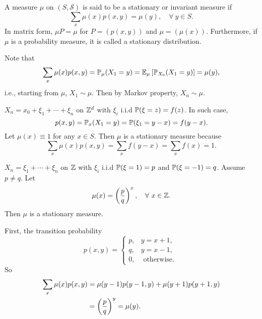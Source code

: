 \begin{defn}
    A measure $\mu$ on $(S,\mathcal{S})$ is said to be a stationary or invariant measure if
    \begin{equation*}
        \sum_x \mu(x)p(x,y) = \mu(y),\quad \forall~y \in S.
    \end{equation*}
    In matrix form, $\mu P = \mu$ for $P = (p(x,y))$ and $\mu = (\mu(x))$. Furthermore, if $\mu$ is a probability measure, it is called a stationary distribution.
\end{defn}
\begin{rmk}
    Note that
    \begin{equation*}
        \sum_x \mu(x)p(x,y) = \mathbb{P}_\mu(X_1 = y) = \mathbb{E}_\mu \left[\mathbb{P}_{X_0}(X_1 = y)\right] = \mu(y),
    \end{equation*}
    i.e., starting from $\mu$, $X_1 \sim \mu$. Then by Markov property, $X_n \sim \mu$.
\end{rmk}

\begin{exam}
    $X_n = x_0 + \xi_1 + \cdots + \xi_n$ on $\mathbb{Z}^d$ with $\xi_i$ i.i.d $\mathbb{P}(\xi = z) = f(z)$. In such case,
    \begin{equation*}
        p(x,y) = \mathbb{P}_x(X_1 = y) = \mathbb{P}(\xi_1 = y - x) = f(y - x).
    \end{equation*}
    Let $\mu(x) \equiv 1$ for any $x \in S$. Then $\mu$ is a stationary measure because
    \begin{equation*}
        \sum_x\mu(x)p(x,y) = \sum_xf(y - x) = \sum_xf(x) = 1.
    \end{equation*}
\end{exam}

\begin{exam}
    $X_n = \xi_1 + \cdots + \xi_n$ on $\mathbb{Z}$ with $\xi_i$ i.i.d $\mathbb{P}(\xi = 1) = p$ and $\mathbb{P}(\xi = -1) = q$. Assume $p \neq q$. Let
    \begin{equation*}
        \mu(x) = \left(\frac{p}{q}\right)^x,\quad \forall~x \in \mathbb{Z}.
    \end{equation*}
    Then $\mu$ is a stationary measure.

    \noindent First, the transition probability
    \begin{equation*}
        p(x,y) = \begin{cases}
            p,&y = x+1, \\
            q,&y= x-1, \\
            0,&\text{ otherwise. }
        \end{cases}
    \end{equation*}
    So
    \begin{equation*}
        \begin{aligned}
            \sum_x\mu(x)p(x,y) &= \mu(y-1)p(y-1,y) + \mu(y+1)p(y+1,y) \\
            &= \left(\frac{p}{q}\right)^y = \mu(y).
        \end{aligned}
    \end{equation*}
\end{exam}

